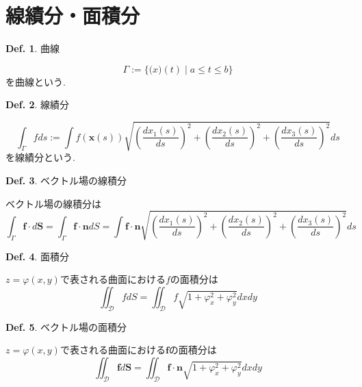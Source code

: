 \documentclass[a4paper,10pt,report]{amsart}
\theoremstyle{plain}
\theoremstyle{definition}
\newtheorem{defn}{Def.}[section]
\theoremstyle{remark}
\begin{document}
    \part{線績分・面積分}
    \begin{leftbar}
        \begin{defn}曲線\par
            \begin{equation*}
                \Gamma:=\{\bm(x)(t)\mid a\leq t\leq b\}
            \end{equation*}
            を曲線という. 
        \end{defn}
    \end{leftbar}
    \begin{leftbar}
        \begin{defn}線績分\par
            \begin{equation}
                \int_{\Gamma}fds:=\int f(\bm{x}(s))\sqrt{{\left(\frac{dx_{1}(s)}{ds}\right)}^{2}+{\left(\frac{dx_{2}(s)}{ds}\right)}^{2}+{\left(\frac{dx_{3}(s)}{ds}\right)}^{2}}ds
            \end{equation}
            を線績分という. 
        \end{defn}
    \end{leftbar}
    \begin{leftbar}
        \begin{defn}ベクトル場の線積分\par
            ベクトル場の線積分は
            \begin{equation}
                \int_{\Gamma}\bm{f}\cdot d\bm{S}=\int_{\Gamma}\bm{f}\cdot\bm{n}dS=\int \bm{f}\cdot\bm{n}\sqrt{{\left(\frac{dx_{1}(s)}{ds}\right)}^{2}+{\left(\frac{dx_{2}(s)}{ds}\right)}^{2}+{\left(\frac{dx_{3}(s)}{ds}\right)}^{2}}ds
            \end{equation}
        \end{defn}
    \end{leftbar}
    \begin{leftbar}
        \begin{defn}面積分\par
            \(z=\varphi(x,y)\)で表される曲面における\(f\)の面積分は
            \begin{equation}
                \iint_{\mathcal{D}}fdS=\iint_{\mathcal{D}}f\sqrt{1+\varphi_{x}^{2}+\varphi_{y}^{2}}dxdy
            \end{equation}
        \end{defn}
    \end{leftbar}
    \begin{leftbar}
        \begin{defn}ベクトル場の面積分\par
            \(z=\varphi(x,y)\)で表される曲面における\(\bm{f}\)の面積分は
            \begin{equation}
                \iint_{\mathcal{D}}\bm{f}d\bm{S}=\iint_{\mathcal{D}}\bm{f}\cdot\bm{n}\sqrt{1+\varphi_{x}^{2}+\varphi_{y}^{2}}dxdy
            \end{equation}
        \end{defn}
    \end{leftbar}
\end{document}
